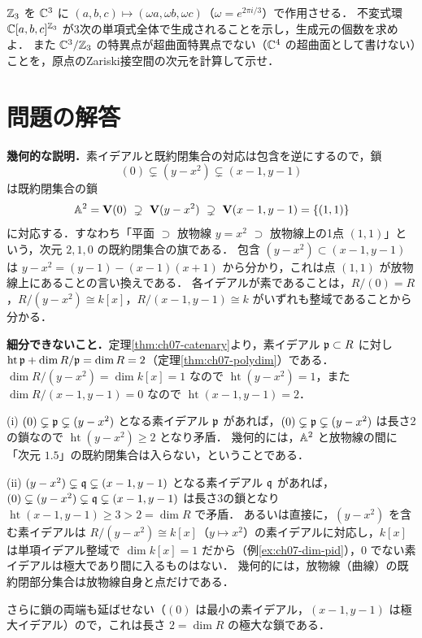 $\mathbb{Z}_3$ を $\mathbb{C}^3$ に $(a,b,c)\mapsto(\omega a,\omega b,\omega c)$（$\omega=e^{2\pi i/3}$）で作用させる．
不変式環 $\mathbb{C}[a,b,c]^{\mathbb{Z}_3}$ が3次の単項式全体で生成されることを示し，生成元の個数を求めよ．
また $\mathbb{C}^3/\mathbb{Z}_3$ の特異点が超曲面特異点でない（$\mathbb{C}^4$ の超曲面として書けない）ことを，原点のZariski接空間の次元を計算して示せ．

\section*{問題の解答}

\textbf{幾何的な説明．}素イデアルと既約閉集合の対応は包含を逆にするので，鎖
\[
  (0)\subsetneq(y-x^2)\subsetneq(x-1,y-1)
\]
は既約閉集合の鎖
\[
  \A^2=\Zero(0)\ \supsetneq\ \Zero(y-x^2)\ \supsetneq\ \Zero(x-1,y-1)=\{(1,1)\}
\]
に対応する．すなわち「平面 $\supset$ 放物線 $y=x^2$ $\supset$ 放物線上の1点 $(1,1)$」という，次元 $2,1,0$ の既約閉集合の旗である．
包含 $(y-x^2)\subset(x-1,y-1)$ は $y-x^2=(y-1)-(x-1)(x+1)$ から分かり，これは点 $(1,1)$ が放物線上にあることの言い換えである．
各イデアルが素であることは，$R/(0)=R$，$R/(y-x^2)\cong k[x]$，$R/(x-1,y-1)\cong k$ がいずれも整域であることから分かる．

\textbf{細分できないこと．}定理\ref{thm:ch07-catenary}より，素イデアル $\mathfrak{p}\subset R$ に対し $\operatorname{ht}\mathfrak{p}+\dim R/\mathfrak{p}=\dim R=2$（定理\ref{thm:ch07-polydim}）である．
$\dim R/(y-x^2)=\dim k[x]=1$ なので $\operatorname{ht}(y-x^2)=1$，また $\dim R/(x-1,y-1)=0$ なので $\operatorname{ht}(x-1,y-1)=2$．

(i) $(0)\subsetneq\mathfrak{p}\subsetneq(y-x^2)$ となる素イデアル $\mathfrak{p}$ があれば，$(0)\subsetneq\mathfrak{p}\subsetneq(y-x^2)$ は長さ2の鎖なので $\operatorname{ht}(y-x^2)\ge2$ となり矛盾．
幾何的には，$\mathbb{A}^2$ と放物線の間に「次元 $1.5$」の既約閉集合は入らない，ということである．

(ii) $(y-x^2)\subsetneq\mathfrak{q}\subsetneq(x-1,y-1)$ となる素イデアル $\mathfrak{q}$ があれば，$(0)\subsetneq(y-x^2)\subsetneq\mathfrak{q}\subsetneq(x-1,y-1)$ は長さ3の鎖となり $\operatorname{ht}(x-1,y-1)\ge3>2=\dim R$ で矛盾．
あるいは直接に，$(y-x^2)$ を含む素イデアルは $R/(y-x^2)\cong k[x]$（$y\mapsto x^2$）の素イデアルに対応し，$k[x]$ は単項イデアル整域で $\dim k[x]=1$ だから（例\ref{ex:ch07-dim-pid}），$0$ でない素イデアルは極大であり間に入るものはない．
幾何的には，放物線（曲線）の既約閉部分集合は放物線自身と点だけである．

さらに鎖の両端も延ばせない（$(0)$ は最小の素イデアル，$(x-1,y-1)$ は極大イデアル）ので，これは長さ $2=\dim R$ の極大な鎖である．


